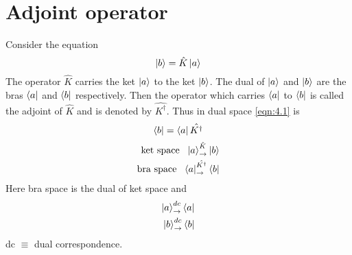 
\ifpdf
\graphicspath{{Chapter4/figs/}}
\else
\graphicspath{{Chapter4/figs/}}
\fi



\section{Adjoint operator}
Consider the equation
\begin{equation}\label{eqn:4.1}
\ket{b} = \hat{K} \ket{a}
\end{equation}
The operator $\hat{K}$ carries the ket $\ket{a}$ to the ket $\ket{b}$. The dual of $\ket{a}$ and $\ket{b}$ are the bras $\bra{a}$ and $\bra{b}$ respectively. Then the operator which carries $\bra{a}$ to $\bra{b}$ is called the adjoint of $\hat{K}$ and is denoted by $\hat{K^\dagger}$. Thus in dual space \ref{eqn:4.1} is
\begin{equation}\label{eqn:4.2}
\bra{b} = \bra{a} \hat{K^\dagger}
\end{equation}
\begin{align}\label{eqn:4.3-4.4}
	\text{ket space \ } \ket{a} _\rightarrow^{\hat{K}} \ket{b}\\
	\text{bra space \ } \bra{a} _\rightarrow^{\hat{K^\dagger}} \bra{b}
\end{align}
Here bra space is the dual of ket space and
\begin{align}\label{eqn:4.5-4.6}
	\ket{a} _\rightarrow^{dc} \bra{a} \\
	\ket{b} _\rightarrow^{dc} \bra{b}
\end{align}
dc $\equiv$ dual correspondence.

